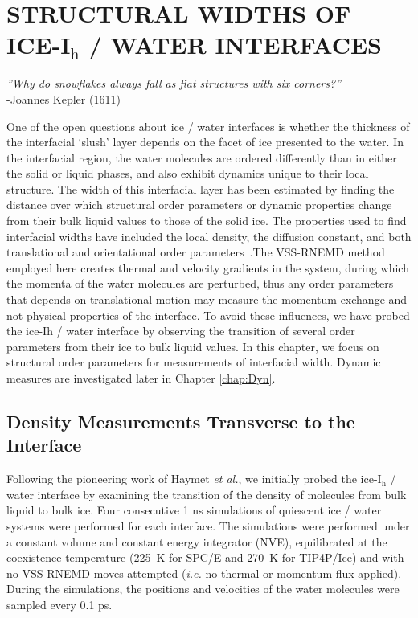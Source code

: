 
\chapter{STRUCTURAL WIDTHS OF ICE-I$_\mathrm{h}$ / WATER
  INTERFACES}\label{chap:Str}


\begin{flushright}
\textit{''Why do snowflakes always fall as flat structures with six corners?''} \\
-Joannes Kepler (1611) \\
\end{flushright}

One of the open questions about ice / water interfaces is whether the
thickness of the interfacial `slush' layer depends on the facet of ice
presented to the water. In the interfacial region, the water molecules
are ordered differently than in either the solid or liquid phases, and
also exhibit dynamics unique to their local structure.  The width of
this interfacial layer has been estimated by finding the distance over
which structural order parameters or dynamic properties change from
their bulk liquid values to those of the solid ice. The properties
used to find interfacial widths have included the local density, the
diffusion constant, and both translational and orientational order
parameters~\cite{Karim1988,Karim1990,Hayward2001,Hayward2002,Bryk2002,Gay2002,Louden2013a}.The
VSS-RNEMD method employed here creates thermal and velocity gradients
in the system, during which the momenta of the water molecules are
perturbed, thus any order parameters that depends on translational
motion may measure the momentum exchange and not physical properties
of the interface. To avoid these influences, we have probed the
ice-I$\mathrm{h}$ / water interface by observing the transition of
several order parameters from their ice to bulk liquid values.  In
this chapter, we focus on structural order parameters for measurements
of interfacial width. Dynamic measures are investigated later in
Chapter \ref{chap:Dyn}.

\section{Density Measurements Transverse to the Interface}
Following the pioneering work of Haymet \textit{et al.}, we initially
probed the ice-I$_\mathrm{h}$ / water interface by examining the
transition of the density of molecules from bulk liquid to bulk
ice. Four consecutive 1 ns simulations of quiescent ice / water
systems were performed for each interface. The simulations were
performed under a constant volume and constant energy integrator
(NVE), equilibrated at the coexistence temperature (225~K for SPC/E
and 270~K for TIP4P/Ice) and with no VSS-RNEMD moves attempted
(\textit{i.e.} no thermal or momentum flux applied). During the
simulations, the positions and velocities of the water molecules were
sampled every 0.1 ps.

